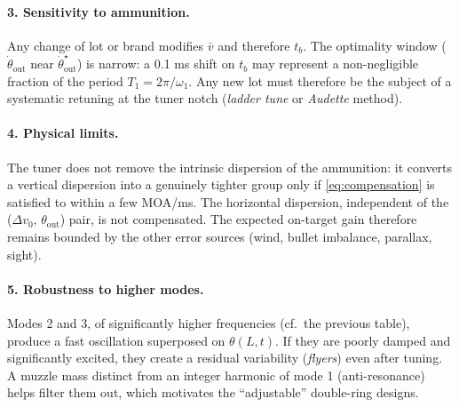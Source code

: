 \documentclass[12pt,a4paper]{article}
\begin{document}
	\paragraph{3. Sensitivity to ammunition.} Any change of lot or brand modifies $\bar v$ and therefore $t_b$. The optimality window ($\dot\theta_\text{out}$ near $\dot\theta^\star_\text{out}$) is narrow: a 0.1 ms shift on $t_b$ may represent a non-negligible fraction of the period $T_1 = 2\pi/\omega_1$. Any new lot must therefore be the subject of a systematic retuning at the tuner notch (\emph{ladder tune} or \emph{Audette} method).

	\paragraph{4. Physical limits.} The tuner does not remove the intrinsic dispersion of the ammunition: it converts a vertical dispersion into a genuinely tighter group only if \eqref{eq:compensation} is satisfied to within a few MOA/ms. The horizontal dispersion, independent of the ($\Delta v_0,\, \theta_\text{out}$) pair, is not compensated. The expected on-target gain therefore remains bounded by the other error sources (wind, bullet imbalance, parallax, sight).

	\paragraph{5. Robustness to higher modes.} Modes 2 and 3, of significantly higher frequencies (cf.\ the previous table), produce a fast oscillation superposed on $\theta(L,t)$. If they are poorly damped and significantly excited, they create a residual variability (\emph{flyers}) even after tuning. A muzzle mass distinct from an integer harmonic of mode 1 (anti-resonance) helps filter them out, which motivates the ``adjustable'' double-ring designs.
\end{document}

